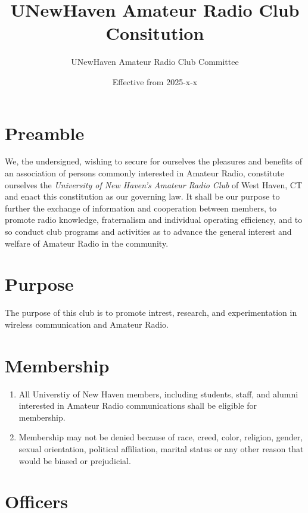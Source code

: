 \documentclass[a4paper,12pt]{article}
\title{UNewHaven Amateur Radio Club Consitution}
\author{UNewHaven Amateur Radio Club Committee}
\date{Effective from 2025-x-x}
\begin{document}
\maketitle

\section{Preamble}
We, the undersigned, wishing to secure for ourselves the pleasures and benefits of an association of
persons commonly interested in Amateur Radio, constitute ourselves the \textit{University of New Haven's Amateur Radio Club}
of West Haven, CT and enact this constitution as our governing law. It shall be our purpose to further the exchange of
information and cooperation between members, to promote radio knowledge, fraternalism and
individual operating efficiency, and to so conduct club programs and activities as to advance the
general interest and welfare of Amateur Radio in the community.

\section{Purpose}
The purpose of this club is to promote intrest, research, and experimentation in wireless communication and Amateur Radio.

\section{Membership}
\begin{enumerate}[label=\thesection.\arabic*.]
  \item All Universtiy of New Haven members, including students, staff, and alumni interested in Amateur Radio communications shall be eligible for membership.
  \item Membership may not be denied because of race, creed, color, religion, gender, sexual orientation,
political affiliation, marital status or any other reason that would be biased or prejudicial.
\end{enumerate}


\section{Officers}

\end{document}
